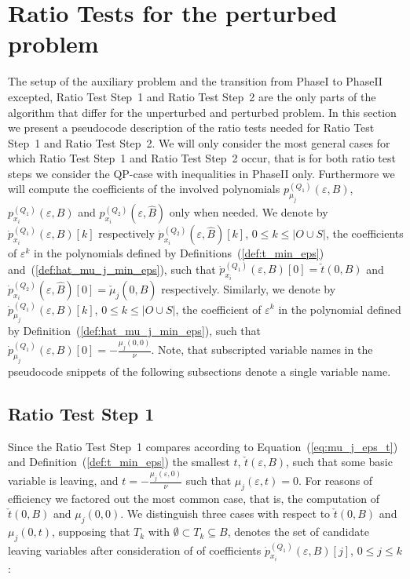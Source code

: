 \documentclass[a4paper]{article}
\newcommand{\pmu}[2]{\ensuremath{p_{\mu_{j}}^{(#1)}(\varepsilon, #2)}}
\newcommand{\pmuz}[2]{\ensuremath{\dot{p}_{\mu_{j}}^{(#1)}(\varepsilon, #2)}}
\newcommand{\px}[3]{\ensuremath{p_{x_{#1}}^{(#2)}(\varepsilon, #3)}}
\newcommand{\pxz}[3]{\ensuremath{\dot{p}_{x_{#1}}^{(#2)}(\varepsilon, #3)}}
\begin{document}
\section{Ratio Tests for the perturbed problem}
The setup of the auxiliary problem and the transition from PhaseI to PhaseII
excepted, Ratio Test Step~1 and Ratio Test
Step~2 are the only parts of the algorithm that differ for the unperturbed and
perturbed problem.
In this section we present a pseudocode description of the ratio tests needed
for Ratio Test Step~1 and Ratio Test Step~2. We will only consider the most
general cases for which Ratio Test Step~1 and Ratio Test Step~2 occur,
that is for both ratio test steps we consider the QP-case with
inequalities in PhaseII only. Furthermore we will compute the coefficients
of the involved
polynomials $\pmu{Q_{1}}{B}$, $\px{i}{Q_{1}}{B}$ and $\px{i}{Q_{2}}{\hat{B}}$
only when needed. We denote by $\pxz{i}{Q_{1}}{B}[k]$ respectively
$\pxz{i}{Q_{2}}{\hat{B}}[k]$, 
$0 \leq k \leq \left|O \cup S\right|$,
the coefficients of $\varepsilon^{k}$ in the polynomials
defined by Definitions~(\ref{def:t_min_eps}) and~(\ref{def:hat_mu_j_min_eps}),
such that $\pxz{i}{Q_{1}}{B}[0]=\check{t}(0, B)$ and 
$\pxz{i}{Q_{2}}{\hat{B}}[0]=\check{\mu}_{j}(0, \hat{B})$ respectively.
Similarly, we denote by $\pmuz{Q_{1}}{B}[k]$,
$0 \leq k \leq \left|O \cup S\right|$, the coefficient of $\varepsilon^{k}$
in the polynomial
defined by Definition~(\ref{def:hat_mu_j_min_eps}), such that
$\pmuz{Q_{1}}{B}[0]=-\frac{\mu_{j}(0,0)}{\nu}$.
Note, that subscripted variable names in the pseudocode snippets of the
following subsections denote a single variable name.

\subsection{Ratio Test Step 1}
Since the Ratio Test Step~1 compares according to
Equation~(\ref{eq:mu_j_eps_t})
and Definition~(\ref{def:t_min_eps}) the smallest $t$,
$\check{t}(\varepsilon, B)$, such that some basic variable is leaving, and
$t=-\frac{\mu_{j}(\varepsilon,0)}{\nu}$ such that $\mu_{j}(\varepsilon,t)=0$.
For reasons of efficiency we factored out the most common case, that is, the
computation of $\check{t}(0, B)$ and $\mu_{j}(0, 0)$. 
We distinguish three cases with respect to $\check{t}(0, B)$ and
$\mu_{j}(0, t)$, supposing that $T_{k}$ with
$\emptyset \subset T_{k} \subseteq B$, denotes the set of candidate
leaving variables after consideration of of
coefficients $\pxz{i}{Q_{1}}{B}[j]$, $0 \leq j \leq k$:
\end{document}
